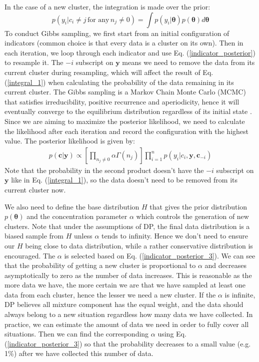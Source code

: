 In the case of a new cluster, the integration is made over the prior:
\begin{equation}
p(y_i|c_i \neq j \, \text{for any} \, n_j \neq 0) = 
\int p(y_i|\bm{\theta})
p(\bm{\theta})d\bm{\theta}
\label{integral_2}
\end{equation}
To conduct Gibbs sampling, we first start from an initial configuration of indicators (common choice is that every data is a cluster on its own).
Then in each iteration, we loop through each indicator and use Eq. (\ref{indicator_posterior}) to resample it. 
The $-i$ subscript on $\bm{y}$ means we need to remove the data from its current cluster during resampling, which will affect the result of Eq. (\ref{integral_1}) when calculating the probability of the data remaining in its current cluster. 
The Gibbs sampling is a Markov Chain Monte Carlo (MCMC) that satisfies irreducibility, positive recurrence and aperiodicity, hence it will eventually converge to the equilibrium distribution regardless of its initial state \cite{MCMC}. 
Since we are aiming to maximize the posterior likelihood, we need to calculate the likelihood after each iteration and record the configuration with the highest value.
The posterior likelihood is given by:
\begin{equation}
\begin{gathered}
p(\bm{c}|\bm{y}) \propto 
\left[\prod_{n_j \neq 0} \alpha \Gamma(n_j)\right]
\prod_{i=1}^n p(y_i|c_i, \bm{y}, \bm{c}_{-i})
\end{gathered}
\label{posterior_likelihood}
\end{equation}
Note that the probability in the second product doesn't have the $-i$ subscript on $\bm{y}$ like in Eq. (\ref{integral_1}), so the data doesn't need to be removed from its current cluster now.


We also need to define the base distribution $H$ that gives the prior distribution $p(\bm{\theta})$ and the concentration parameter $\alpha$ which controls the generation of new clusters.
Note that under the assumptions of DP, the final data distribution is a biased sample from $H$ unless $\alpha$ tends to infinity. Hence we don't need to ensure our $H$ being close to data distribution, while a rather conservative distribution is encouraged.
The $\alpha$ is selected based on Eq. (\ref{indicator_posterior_3}).
We can see that the probability of getting a new cluster is proportional to $\alpha$ and decreases asymptotically to zero as the number of data increases.
This is reasonable as the more data we have, the more certain we are that we have sampled at least one data from each cluster, hence the lesser we need a new cluster. 
If the $\alpha$ is infinite, DP believes all mixture component has the equal weight, and the data should always belong to a new situation regardless how many data we have collected.
In practice, we can estimate the amount of data we need in order to fully cover all situations. Then we can find the corresponding $\alpha$ using Eq. (\ref{indicator_posterior_3}) so that the probability decreases to a small value (e.g. 1\%) after we have collected this number of data.

